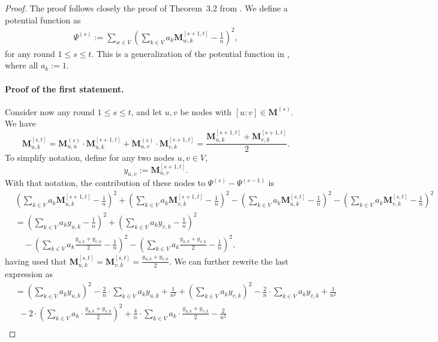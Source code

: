 \documentclass[twoside,leqno]{article}
\newcommand{\M}{\mathbf{M}}
\DeclareMathOperator{\1}{\mathbf{1}}
\numberwithin{equation}{section}
\begin{document}
\begin{proof}



The proof follows closely the proof of Theorem~3.2 from \cite{DBLP:conf/focs/SauerwaldS12}.
We define a potential function as
\begin{align*}
\Psi^{(s)} := \sum_{w \in V} \left( \sum_{k \in V} a_k \M_{w,k}^{[s+1,t]} - \frac{1}{n} \right)^2,
\end{align*}
for any round $1 \leq s \leq t$. This is a generalization of the potential function in \cite{DBLP:conf/focs/SauerwaldS12}, where all $a_k:=1$.


\paragraph{Proof of the first statement.}
Consider now any round $1 \leq s \leq t$, and let $u,v $ be nodes with $[u:v] \in \M^{(s)}$.
We have
\[
\M_{u,k}^{[s,t]} = \M_{u,u}^{(s)}\cdot \M_{u,k}^{[s+1,t]} + \M_{u,v}^{(s)}\cdot \M_{v,k}^{[s+1,t]}  = \frac{ \M_{u,k}^{[s+1,t]} + \M_{v,k}^{[s+1,t]} }{2}.
\]
To simplify notation, define for any two nodes $u,v \in V$,
\[
y_{u,v} := \M_{u,v}^{[s+1,t]}.
\]
With that notation, the contribution of these nodes to $\Psi^{(s)} - \Psi^{(s-1)}$ is
\begin{align*}
& \left( \sum_{k \in V} a_k \M_{u,k}^{[s+1,t]} - \frac{1}{n} \right)^2 + \left( \sum_{k \in V} a_k \M_{v,k}^{[s+1,t]} - \frac{1}{n} \right)^2 - \left( \sum_{k \in V} a_k \M_{u,k}^{[s,t]} - \frac{1}{n} \right)^2 - \left( \sum_{k \in V} a_k \M_{v,k}^{[s,t]} - \frac{1}{n} \right)^2 \\
&= \left( \sum_{k \in V} a_k y_{u,k} - \frac{1}{n} \right)^2 + \left( \sum_{k \in V} a_k y_{v,k} - \frac{1}{n} \right)^2  \\
&\quad- \left( \sum_{k \in V} a_k \frac{y_{u,k}+y_{v,k}}{2} - \frac{1}{n} \right)^2 - \left( \sum_{k \in V} a_k \frac{y_{u,k}+y_{v,k}}{2} - \frac{1}{n} \right)^2\!\!,
\end{align*}
having used that $\M_{u,k}^{[s,t]} = \M_{v,k}^{[s,t]} = \frac{y_{u,k}+y_{v,k}}{2}$. We can further rewrite the last expression as
\begin{align*}
&= \left( \sum_{k \in V} a_k y_{u,k} \right)^2 - \frac{2}{n} \cdot \sum_{k \in V} a_k y_{u,k} + \frac{1}{n^2} + \left( \sum_{k \in V} a_k y_{v,k} \right)^2 - \frac{2}{n} \cdot \sum_{k \in V} a_k y_{v,k} + \frac{1}{n^2} \\
&~~ - 2 \cdot \left( \sum_{k \in V} a_k \cdot \frac{y_{u,k}+y_{v,k}}{2} \right)^2 + \frac{4}{n} \cdot \sum_{k \in V} a_k \cdot \frac{y_{u,k}+y_{v,k}}{2} - \frac{2}{n^2} \\

\end{align*}
\end{proof}
\end{document}
